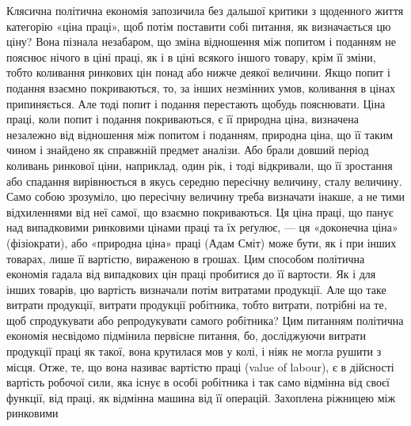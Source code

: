 Клясична політична економія запозичила без дальшої критики
з щоденного життя категорію «ціна праці», щоб потім поставити
собі питання, як визначається цю ціну? Вона пізнала
незабаром, що зміна відношення між попитом і поданням не
пояснює нічого в ціні праці, як і в ціні всякого іншого товару,
крім її зміни, тобто коливання ринкових цін понад або нижче
деякої величини. Якщо попит і подання взаємно покриваються,
то, за інших незмінних умов, коливання в цінах припиняється.
Але тоді попит і подання перестають щобудь пояснювати. Ціна
праці, коли попит і подання покриваються, є її природна ціна,
визначена незалежно від відношення між попитом і поданням,
природна ціна, що її таким чином і знайдено як справжній предмет
аналізи. Або брали довший період коливань ринкової ціни,
наприклад, один рік, і тоді відкривали, що її зростання або
спадання вирівнюється в якусь середню пересічну величину,
сталу величину. Само собою зрозуміло, цю пересічну величину
треба визначати інакше, а не тими відхиленнями від неї самої,
що взаємно покриваються. Ця ціна праці, що панує над випадковими
ринковими цінами праці та їх реґулює, — ця «доконечна
ціна» (фізіократи), або «природна ціна» праці (Адам Сміт) може
бути, як і при інших товарах, лише її вартістю, вираженою в
грошах. Цим способом політична економія гадала від випадкових
цін праці пробитися до її вартости. Як і для інших товарів,
цю вартість визначали потім витратами продукції. Але що таке
витрати продукції, витрати продукції робітника, тобто витрати,
потрібні на те, щоб спродукувати або репродукувати самого
робітника? Цим питанням політична економія несвідомо підмінила
первісне питання, бо, досліджуючи витрати продукції
праці як такої, вона крутилася мов у колі, і ніяк не могла рушити
з місця. Отже, те, що вона називає вартістю праці (value of labour),
є в дійсності вартість робочої сили, яка існує в особі
робітника і так само відмінна від своєї функції, від праці, як
відмінна машина від її операцій. Захоплена ріжницею між ринковими
\parbreak{}  %

